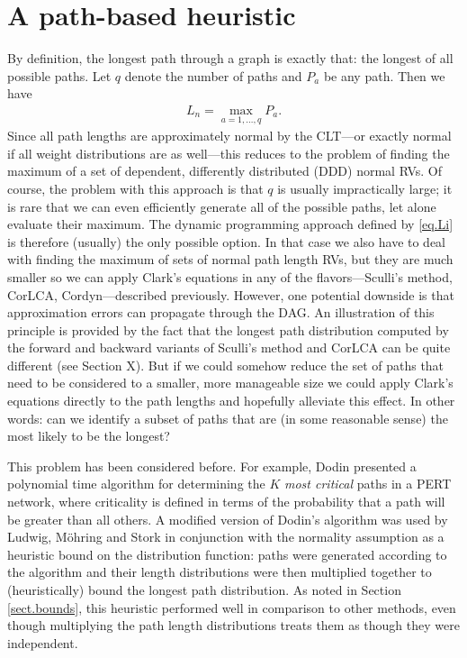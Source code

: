 \documentclass[12pt]{article}
\begin{document}
\section{A path-based heuristic}
\label{sect.path_heuristic}

By definition, the longest path through a graph is exactly that: the longest of all possible paths. Let $q$ denote the number of paths and $P_a$ be any path. Then we have
\begin{align}
  \label{eq.lp_definition}
  L_n = \max_{a = 1, \dots, q} P_a.
\end{align}
Since all path lengths are approximately normal by the CLT---or exactly normal if all weight distributions are as well---this reduces to the problem of finding the maximum of a set of dependent, differently distributed (DDD) normal RVs. Of course, the problem with this approach is that $q$ is usually impractically large; it is rare that we can even efficiently generate all of the possible paths, let alone evaluate their maximum. The dynamic programming approach defined by \eqref{eq.Li} is therefore (usually) the only possible option. In that case we also have to deal with finding the maximum of sets of normal path length RVs, but they are much smaller so we can apply Clark's equations in any of the flavors---Sculli's method, CorLCA, Cordyn---described previously. However, one potential downside is that approximation errors can propagate through the DAG. An illustration of this principle is provided by the fact that the longest path distribution computed by the forward and backward variants of Sculli's method and CorLCA can be quite different (see Section X). But if we could somehow reduce the set of paths that need to be considered to a smaller, more manageable size we could apply Clark's equations directly to the path lengths and hopefully alleviate this effect. In other words: can we identify a subset of paths that are (in some reasonable sense) the most likely to be the longest?

This problem has been considered before. For example, Dodin \cite{dod84} presented a polynomial time algorithm for determining the $K$ {\em most critical} paths in a PERT network, where criticality is defined in terms of the probability that a path will be greater than all others. A modified version of Dodin's algorithm was used by Ludwig, M{\"o}hring and Stork \cite{lud01} in conjunction with the normality assumption as a heuristic bound on the distribution function: paths were generated according to the algorithm and their length distributions were then multiplied together to (heuristically) bound the longest path distribution. As noted in Section \ref{sect.bounds}, this heuristic performed well in comparison to other methods, even though multiplying the path length distributions treats them as though they were independent.
\end{document}
